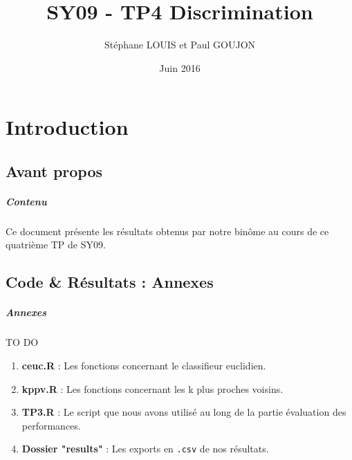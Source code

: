 \documentclass{report}
\begin{document}

\title{SY09 - TP4 Discrimination}
\date{Juin 2016}
\author{Stéphane LOUIS et Paul GOUJON}
\maketitle

\newpage
\tableofcontents{}

\newpage
{}
\chapter{Introduction}

\section{Avant propos}
\paragraph{Contenu}
Ce document présente les résultats obtenus par notre binôme au cours de ce quatrième TP de SY09.

\section{Code \& Résultats : Annexes}
\paragraph{Annexes}
TO DO
\begin{enumerate}
    \item \textbf{ceuc.R} : Les fonctions concernant le classifieur euclidien.
    \item \textbf{kppv.R} : Les fonctions concernant les k plus proches voisins.
    \item \textbf{TP3.R} : Le script que nous avons utilisé au long de la partie évaluation des performances.
    \item \textbf{Dossier "results"} : Les exports en \verb+.csv+ de nos résultats.
\end{enumerate}
\end{document}
